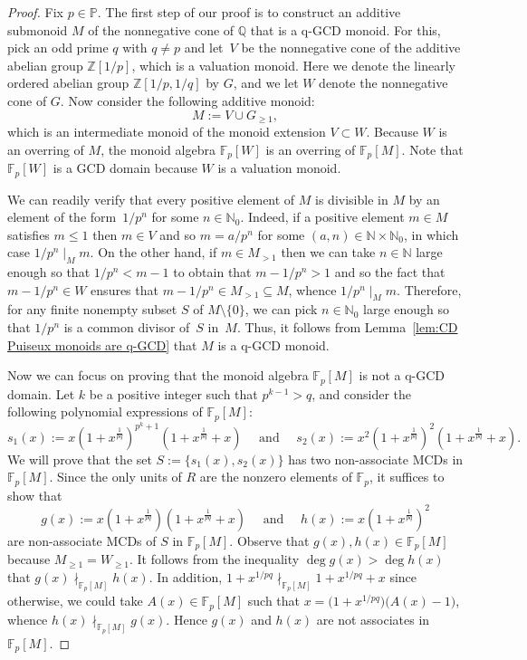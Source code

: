 \documentclass[10pt]{amsart}
\theoremstyle{definition}
\theoremstyle{remark}
\numberwithin{equation}{section}
\newcommand{\ff}{\mathbb{F}}
\newcommand{\nn}{\mathbb{N}}
\newcommand{\pp}{\mathbb{P}}
\newcommand{\qq}{\mathbb{Q}}
\newcommand{\zz}{\mathbb{Z}}
\begin{document}
\begin{proof}
  Fix $p \in \pp$. The first step of our proof is to construct an additive submonoid $M$ of the nonnegative cone of $\qq$ that is a q-GCD monoid. For this, pick an odd prime $q$ with $q \neq p$ and let~$V$ be the nonnegative cone of the additive abelian group $\zz[1/p]$, which is a valuation monoid. Here we denote the linearly ordered abelian group $\zz[1/p, 1/q]$ by $G$, and we let $W$ denote the nonnegative cone of $G$. Now consider the following additive monoid:
  \[
    M := V \cup G_{\ge 1},
  \]
  which is an intermediate monoid of the monoid extension $V \subset W$. Because $W$ is an overring of $M$, the monoid algebra $\ff_p[W]$ is an overring of $\ff_p[M]$. Note that $\ff_p[W]$ is a GCD domain because $W$ is a valuation monoid.
  \smallskip

  We can readily verify that every positive element of $M$ is divisible in $M$ by an element of the form~$1/p^n$ for some $n \in \nn_0$. Indeed, if a positive element $m \in M$ satisfies $m \le 1$ then $m \in V$ and so $m = a/p^n$ for some $(a,n) \in \nn \times \nn_0$, in which case $1/p^n \mid_M m$. On the other hand, if $m \in M_{>1}$ then we can take $n \in \nn$ large enough so that $1/p^n < m-1$ to obtain that $m - 1/p^n > 1$ and so the fact that $m - 1/p^n \in W$ ensures that $m - 1/p^n \in M_{>1} \subseteq M$, whence $1/p^n \mid_M m$. Therefore, for any finite nonempty subset $S$ of $M \setminus \{0\}$, we can pick $n \in \nn_0$ large enough so that $1/p^n$ is a common divisor of~$S$ in~$M$. Thus, it follows from Lemma~\ref{lem:CD Puiseux monoids are q-GCD} that $M$ is a q-GCD monoid.
  \smallskip

  Now we can focus on proving that the monoid algebra $\ff_p[M]$ is not a q-GCD domain. Let $k$ be a positive integer such that $p^{k-1} > q$, and consider the following polynomial expressions of $\ff_p[M]$:
  \[
    s_1(x) := x(1+x^{\frac{1}{pq}})^{p^k+1}(1+x^{\frac{1}{pq}} + x) \quad \text{ and } \quad s_2(x) := x^2(1+x^{\frac{1}{pq}})^2(1+x^{\frac{1}{pq}}+x).
  \]
  We will prove that the set $S:=\{s_1(x),s_2(x)\}$ has two non-associate MCDs in $\ff_p[M]$. Since the only units of $R$ are the nonzero elements of $\ff_p$, it suffices to show that
  \[
    g(x) := x(1+x^{\frac{1}{pq}})(1+x^{\frac{1}{pq}}+x) \quad \text{ and } \quad h(x) := x(1+x^{\frac{1}{pq}})^2
  \]
  are non-associate MCDs of $S$ in $\ff_p[M]$. Observe that $g(x), h(x) \in \ff_p[M]$ because $M_{\ge 1} = W_{\ge 1}$. It follows from the inequality $\deg g(x) > \deg h(x)$ that $g(x) \nmid_{\ff_p[M]} h(x)$. In addition, $1 + x^{1/pq} \nmid_{\ff_p[M]} 1 + x^{1/pq} + x$ since otherwise, we could take $A(x) \in \ff_p[M]$ such that $x = \big(1 + x^{1/pq}\big)\big(A(x)-1\big)$, whence $h(x) \nmid_{\ff_p[M]} g(x)$. Hence $g(x)$ and $h(x)$ are not associates in $\ff_p[M]$.
  \smallskip


\end{proof}
\end{document}
